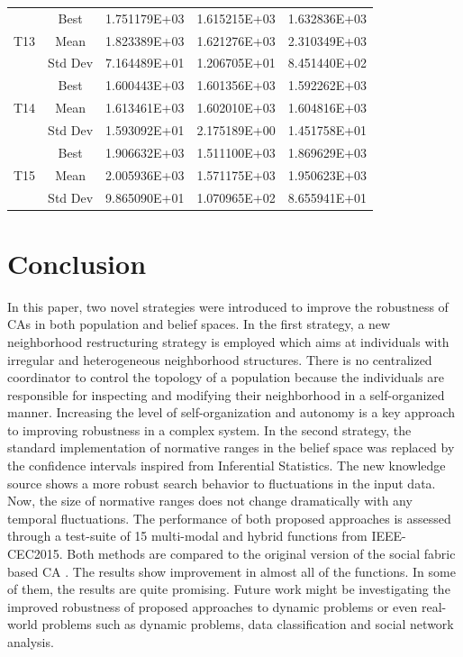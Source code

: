 \documentclass[letterpaper]{article}
\begin{document}
\begin{center}
\begin{table}[htbp]
\begin{center}
{\begin{tabular}{|c|c|c|c|c|}
				\multicolumn{ 1}{|c|}{} & Best & 1.751179E+03 & 1.615215E+03 & 1.632836E+03 \\ \cline{ 2- 5}
				\multicolumn{ 1}{|c|}{T13} & Mean & 1.823389E+03 & 1.621276E+03 & 2.310349E+03 \\ \cline{ 2- 5}
				\multicolumn{ 1}{|c|}{} & Std Dev & 7.164489E+01 & 1.206705E+01 & 8.451440E+02 \\ \hline
				\multicolumn{ 1}{|c|}{} & Best & 1.600443E+03 & 1.601356E+03 & 1.592262E+03 \\ \cline{ 2- 5}
				\multicolumn{ 1}{|c|}{T14} & Mean & 1.613461E+03 & 1.602010E+03 & 1.604816E+03 \\ \cline{ 2- 5}
				\multicolumn{ 1}{|c|}{} & Std Dev & 1.593092E+01 & 2.175189E+00 & 1.451758E+01 \\ \hline
				\multicolumn{ 1}{|c|}{} & Best & 1.906632E+03 & 1.511100E+03 & 1.869629E+03 \\ \cline{ 2- 5}
				\multicolumn{ 1}{|c|}{T15} & Mean & 2.005936E+03 & 1.571175E+03 & 1.950623E+03 \\ \cline{ 2- 5}
				\multicolumn{ 1}{|c|}{} & Std Dev & 9.865090E+01 & 1.070965E+02 & 8.655941E+01 \\ \hline
			\end{tabular}}
	\end{center}
	\label{results}
\end{table}
\end{center}
\section{Conclusion}
In this paper, two novel strategies were introduced to improve the robustness of CAs in both population and belief spaces. In the first strategy, a new neighborhood restructuring strategy is employed which aims at individuals with irregular and heterogeneous neighborhood structures. There is no centralized coordinator to control the topology of a population because the individuals are responsible for inspecting and modifying their neighborhood in a self-organized manner. Increasing the level of self-organization and autonomy is a key approach to improving robustness in a complex system.  In the second strategy, the standard implementation of normative ranges in the belief space was replaced by the confidence intervals inspired from Inferential Statistics. The new knowledge source shows a more robust search behavior to fluctuations in the input data. Now, the size of normative ranges does not change dramatically with any temporal fluctuations.\newline
The performance of both proposed approaches is assessed through a test-suite of 15 multi-modal and hybrid functions from IEEE-CEC2015. Both methods are compared to the original version of the social fabric based CA \cite{ali2016leveraged}. The results show improvement in almost all of the functions. In some of them, the results are quite promising. Future work might be investigating the improved robustness of proposed approaches to dynamic problems or even real-world problems such as dynamic problems, data classification and social network analysis.


\end{document}
